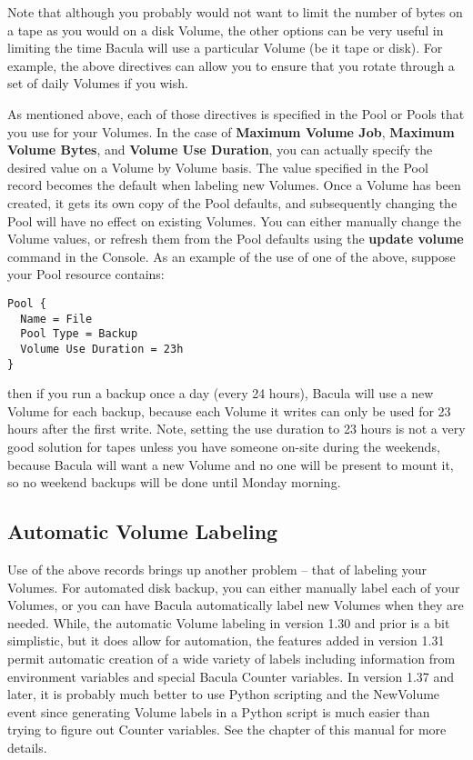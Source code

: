 Note that although you probably would not want to limit the number of bytes on
a tape as you would on a disk Volume, the other options can be very useful in
limiting the time Bacula will use a particular Volume (be it tape or disk).
For example, the above directives can allow you to ensure that you rotate
through a set of daily Volumes if you wish. 

As mentioned above, each of those directives is specified in the Pool or
Pools that you use for your Volumes. In the case of {\bf Maximum Volume Job},
{\bf Maximum Volume Bytes}, and {\bf Volume Use Duration}, you can actually
specify the desired value on a Volume by Volume basis. The value specified in
the Pool record becomes the default when labeling new Volumes. Once a Volume
has been created, it gets its own copy of the Pool defaults, and subsequently
changing the Pool will have no effect on existing Volumes. You can either
manually change the Volume values, or refresh them from the Pool defaults using
the {\bf update volume} command in the Console. As an example
of the use of one of the above, suppose your Pool resource contains: 

\footnotesize
\begin{verbatim}
Pool {
  Name = File
  Pool Type = Backup
  Volume Use Duration = 23h
}
\end{verbatim}
\normalsize

then if you run a backup once a day (every 24 hours), Bacula will use a new
Volume for each backup, because each Volume it writes can only be used for 23 hours
after the first write. Note, setting the use duration to 23 hours is not a very 
good solution for tapes unless you have someone on-site during the weekends,
because Bacula will want a new Volume and no one will be present to mount it,
so no weekend backups will be done until Monday morning.

\label{AutomaticLabeling}
\subsection{Automatic Volume Labeling}

Use of the above records brings up another problem -- that of labeling your
Volumes. For automated disk backup, you can either manually label each of your
Volumes, or you can have Bacula automatically label new Volumes when they are
needed. While, the automatic Volume labeling in version 1.30 and prior is a
bit simplistic, but it does allow for automation, the features added in
version 1.31 permit automatic creation of a wide variety of labels including
information from environment variables and special Bacula Counter variables. 
In version 1.37 and later, it is probably much better to use Python scripting 
and the NewVolume event since generating Volume labels in a Python script is
much easier than trying to figure out Counter variables. See the
 chapter of this manual for more
details.

